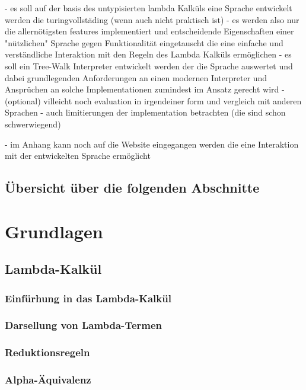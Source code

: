 \documentclass{article}
\begin{document}
- es soll auf der basis des untypisierten lambda Kalküls eine Sprache entwickelt werden die turingvollstäding (wenn auch nicht praktisch ist)
    - es werden also nur die allernötigsten features implementiert und entscheidende Eigenschaften einer "nützlichen" Sprache gegen Funktionalität eingetauscht die eine einfache und verständliche Interaktion mit den Regeln des Lambda Kalküls ermöglichen
- es soll ein Tree-Walk Interpreter entwickelt werden der die Sprache auswertet und dabei grundlegenden Anforderungen an einen modernen Interpreter und Ansprüchen an solche Implementationen zumindest im Ansatz gerecht wird 
- (optional) villeicht noch evaluation in irgendeiner form und vergleich mit anderen Sprachen 
- auch limitierungen der implementation betrachten (die sind schon schwerwiegend)

- im Anhang kann noch auf die Website eingegangen werden die eine Interaktion mit der entwickelten Sprache ermöglicht

\subsection{Übersicht über die folgenden Abschnitte}



\section{Grundlagen}

\subsection{Lambda-Kalkül}

\subsubsection{Einfürhung in das Lambda-Kalkül}

\subsubsection{Darsellung von Lambda-Termen}

\subsubsection{Reduktionsregeln}

\subsubsection{Alpha-Äquivalenz}
\end{document}
